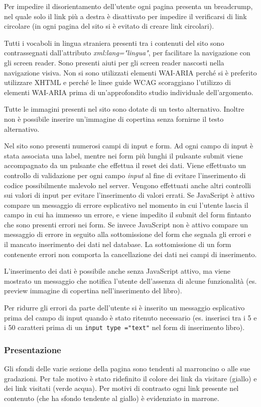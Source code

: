 \documentclass[12pt,a4paper,headings=optiontohead]{article}
\begin{document}
Per impedire il disorientamento dell'utente ogni pagina presenta un breadcrump, nel quale solo il link più a destra è disattivato per impedire il verificarsi di link circolare (in ogni pagina del sito si è evitato di creare link circolari).

Tutti i vocaboli in lingua straniera presenti tra i contenuti del sito sono contrassegnati dall'attributo \textit{xml:lang="lingua"}, per facilitare la navigazione con gli screen reader. Sono presenti aiuti per gli screen reader nascosti nella navigazione visiva. Non si sono utilizzati elementi WAI-ARIA perché si è preferito utilizzare XHTML e perché le linee guide WCAG scoraggiano l'utilizzo di elementi WAI-ARIA prima di un'approfondito studio individuale dell'argomento.

Tutte le immagini presenti nel sito sono dotate di un testo alternativo. Inoltre non è possibile inserire un'immagine di copertina senza fornirne il testo alternativo.

Nel sito sono presenti numerosi campi di input e form. Ad ogni campo di input è stata associata una label, mentre nei form più lunghi il pulsante submit viene accompagnato da un pulsante che effettua il reset dei dati. Viene effettuato un controllo di validazione per ogni campo \textit{input} al fine di evitare l'inserimento di codice possibilmente malevolo nel server. 
Vengono effettuati anche altri controlli sui valori di input per evitare l'inserimento di valori errati. Se JavaScript è attivo compare un messaggio di errore esplicativo nel momento in cui l'utente lascia il campo in cui ha immesso un errore, e viene impedito il submit del form fintanto che sono presenti errori nei form. Se invece JavaScript non è attivo compare un messaggio di errore in seguito alla sottomissione del form che segnala gli errori e il mancato inserimento dei dati nel database. La sottomissione di un form contenente errori non comporta la cancellazione dei dati nei campi di inserimento.

L'inserimento dei dati è possibile anche senza JavaScript attivo, ma viene mostrato un messaggio che notifica l'utente dell'assenza di alcune funzionalità (es. preview immagine di copertina nell'inserimento del libro).

Per ridurre gli errori da parte dell'utente si è inserito un messaggio esplicativo prima del campo di input quando è stato ritenuto necessario (es. inserisci tra i 5 e i 50 caratteri prima di un \texttt{input type ="text"} nel form di inserimento libro). 

\subsubsection{Presentazione}
Gli sfondi delle varie sezione della pagina sono tendenti al marroncino o alle sue gradazioni. Per tale motivo è stato ridefinito il colore dei link da visitare (giallo) e dei link visitati (verde acqua). Per motivi di contrasto ogni link presente nel contenuto (che ha sfondo tendente al giallo) è evidenziato in marrone.
\end{document}
